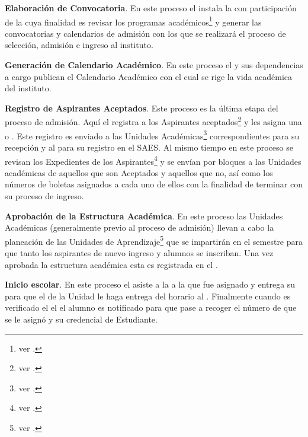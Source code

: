 
\begin{ADescripcion}
	\item \textbf{Elaboración de Convocatoria}. En este proceso el  instala la  con participación de la  cuya finalidad es revisar los programas académicos\footnote{ver .} y generar las convocatorias y calendarios de admisión con los que se realizará el proceso de selección, admisión e ingreso al instituto.
	
	\item \textbf{Generación de Calendario Académico}. En este proceso el  y sus dependencias a cargo publican el Calendario Académico con el cual se rige la vida académica del instituto.
	
	\item \textbf{Registro de Aspirantes Aceptados}. Este proceso es la última etapa del proceso de admisión. Aquí el  registra a los Aspirantes aceptados\footnote{ver .} y les asigna una  o . Este registro es enviado a las Unidades Académicas\footnote{ver .} correspondientes para su recepción y al  para su registro en el SAES. Al mismo tiempo en este proceso se revisan los Expedientes de los Aspirantes\footnote{ver .} y se envían por bloques a las Unidades académicas de aquellos que son Aceptados y aquellos que no, así como los números de boletas asignados a cada uno de ellos con la finalidad de terminar con su proceso de ingreso.
	
	\item \textbf{Aprobación de la Estructura Académica}. En este proceso las Unidades Académicas (generalmente previo al proceso de admisión) llevan a cabo la planeación de las Unidades de Aprendizaje\footnote{ver .} que se impartirán en el semestre para que tanto los aspirantes de nuevo ingreso y alumnos se inscriban. Una vez aprobada la estructura académica esta es registrada en el .
	
	\item \textbf{Inicio escolar}. En este proceso el  asiste a la  a la que fue asignado y entrega su  para que el  de la Unidad le haga entrega del horario al . Finalmente cuando es verificado el  el el alumno es notificado para que pase a recoger el número de  que se le asignó y su credencial de Estudiante.
\end{ADescripcion}
